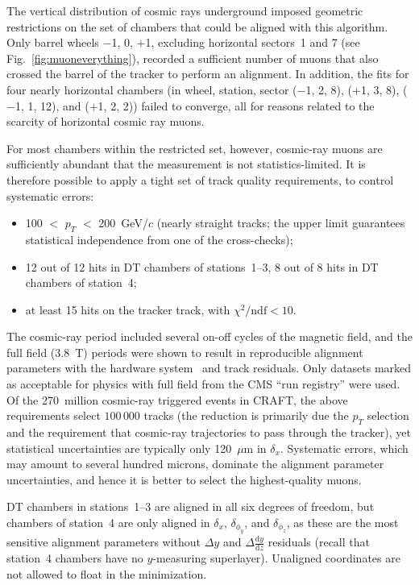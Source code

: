 \documentclass[11pt,twoside,a4paper,cmspaper]{cms-tdr}
\begin{document}
The vertical distribution of cosmic rays underground imposed geometric
restrictions on the set of chambers that could be aligned with this
algorithm.  Only barrel wheels $-$1, 0, $+$1, excluding horizontal
sectors~1 and 7 (see Fig.~\ref{fig:muoneverything}), recorded a
sufficient number of muons that also crossed the barrel of the tracker
to perform an alignment.  In addition, the fits for four nearly
horizontal chambers (in wheel, station, sector ($-$1, 2, 8), ($+$1, 3,
8), ($-$1, 1, 12), and ($+$1, 2, 2)) failed to converge, all for
reasons related to the scarcity of horizontal cosmic ray muons.

For most chambers within the restricted set, however, cosmic-ray muons are
sufficiently abundant that the measurement is not statistics-limited.
It is therefore possible to apply a tight set of track quality
requirements, to control systematic errors:
\begin{itemize}
\item 100 $<$ $p_T$ $<$ 200~GeV/$c$ (nearly straight tracks; the upper
limit guarantees statistical independence from one of the cross-checks);
\item 12 out of 12 hits in DT chambers of stations~1--3, 8 out of 8 hits
in DT chambers of station~4;
\item at least 15 hits on the tracker track, with $\chi^2/\mbox{ndf} <
10$.
\end{itemize}
The cosmic-ray period included several on-off cycles of the magnetic
field, and the full field (3.8~T) periods were shown to result in
reproducible alignment parameters with the hardware
system~\cite{ref:hardware_alignment} and track residuals.  Only
datasets marked as acceptable for physics with full field from the CMS
``run registry'' \cite{ref:CRAFTGeneral} were used.  Of the
270~million cosmic-ray triggered events in CRAFT, the above
requirements select $100\,000$ tracks (the reduction is primarily due
the $p_T$ selection and the requirement that cosmic-ray trajectories
to pass through the tracker), yet statistical uncertainties are
typically only 120~$\mu$m in $\delta_x$.  Systematic errors, which may
amount to several hundred microns, dominate the alignment parameter
uncertainties, and hence it is better to select the highest-quality
muons.

DT chambers in stations~1--3 are aligned in all six degrees of
freedom, but chambers of station~4 are only aligned in $\delta_x$,
$\delta_{\phi_y}$, and $\delta_{\phi_z}$, as these are the most sensitive
alignment parameters without $\Delta y$ and $\Delta \frac{\textrm{d}y}{\textrm{d}z}$
residuals (recall that station~4 chambers have no $y$-measuring
superlayer).  Unaligned coordinates are not allowed to float in the
minimization.
\end{document}
